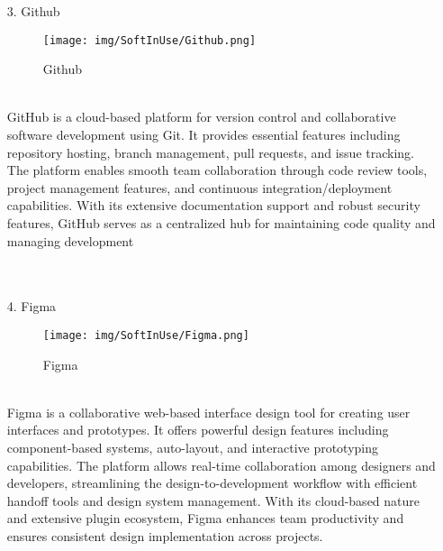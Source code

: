 \documentclass[conference]{IEEEtran}
\begin{document}
\begin{enumerate}
\item[3.] Github
\begin{figure}[h]
\hspace{1.5cm}
\centering
\begin{minipage}{0.4\columnwidth}
    \texttt{[image: img/SoftInUse/Github.png]}
    \caption{Github}
\end{minipage}
\end{figure}\\
GitHub is a cloud-based platform for version control and collaborative software development using Git. It provides essential features including repository hosting, branch management, pull requests, and issue tracking. The platform enables smooth team collaboration through code review tools, project management features, and continuous integration/deployment capabilities. With its extensive documentation support and robust security features, GitHub serves as a centralized hub for maintaining code quality and managing development \\ \\ \\

\item[4.] Figma
\begin{figure}[h]
\hspace{1cm}
\centering
\begin{minipage}{0.4\columnwidth}
    \texttt{[image: img/SoftInUse/Figma.png]}
    \caption{Figma}
\end{minipage}
\end{figure}\\
Figma is a collaborative web-based interface design tool for creating user interfaces and prototypes. It offers powerful design features including component-based systems, auto-layout, and interactive prototyping capabilities. The platform allows real-time collaboration among designers and developers, streamlining the design-to-development workflow with efficient handoff tools and design system management. With its cloud-based nature and extensive plugin ecosystem, Figma enhances team productivity and ensures consistent design implementation across projects.\\


\end{enumerate}
\end{document}
